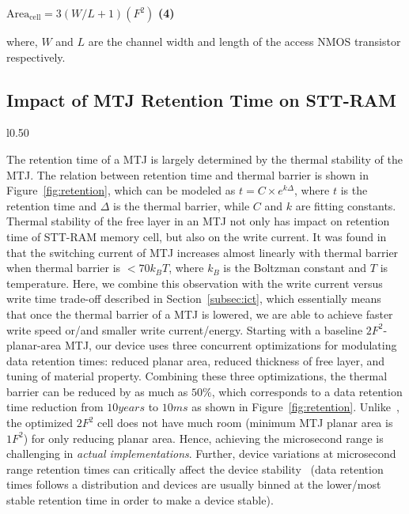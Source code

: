  {
 \small{
 \hspace{55mm} $\mathrm{Area}_{\mathrm{cell}}={3\left(W/L+1\right)}(F^2)$ \hspace{3mm} \textbf{(4)}
 }
 }

where, $W$ and $L$ are the channel width and length of the access NMOS transistor respectively.

\subsection{Impact of MTJ Retention Time on STT-RAM} \label{subsec:retention}

\begin{wrapfigure}{l}{0.50\textwidth}
\centering
  \caption{\label{fig:retention} MTJ thermal stability requirement for different retention time}
\end{wrapfigure}

The retention time of a MTJ is largely determined by the thermal stability of the MTJ. The relation
between retention time and thermal barrier is shown in Figure~\ref{fig:retention}, which can be
modeled as $t=C\times e^{k\Delta}$, where $t$ is the retention time and $\Delta$ is the thermal
barrier, while $C$ and $k$ are fitting constants. Thermal stability of the free layer in an MTJ not
only has impact on retention time of STT-RAM memory cell, but also on the write current. It was found
in~\cite{PMTJ:Toshiba08} that the switching current of MTJ increases almost linearly with thermal
barrier when thermal barrier is $<70k_{B}T$, where $k_{B}$ is the Boltzman constant and $T$ is
temperature. Here, we combine this observation with the write current versus write time trade-off
described in Section~\ref{subsec:ict}, which essentially means that once the thermal barrier of a MTJ
is lowered, we are able to achieve faster write speed or/and smaller write current/energy. Starting
with a baseline $2F^2$-planar-area MTJ, our device uses three concurrent optimizations for modulating
data retention times: reduced planar area, reduced thickness of free layer, and tuning of material
property. Combining these three optimizations, the thermal barrier can be reduced by as much as
$50\%$, which corresponds to a data retention time reduction from $10years$ to $10ms$ as shown in
Figure~\ref{fig:retention}. Unlike~\cite{STTRAM:HPCA11}, the optimized $2F^2$ cell does not have much
room (minimum MTJ planar area is $1F^2$) for only reducing planar area. Hence, achieving the
microsecond range is challenging in {\it actual implementations}. Further, device variations at
microsecond range retention times can critically affect the device stability~\cite{STTRAM:Qualcomm09}
(data retention times follows a distribution and devices are usually binned at the lower/most stable
retention time in order to make a device stable).

